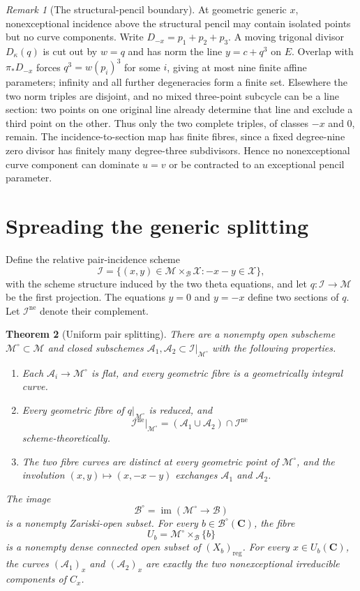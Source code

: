 \documentclass[10pt]{amsart}
\numberwithin{equation}{section}
\newtheorem{theorem}{Theorem}[section]
\theoremstyle{definition}
\theoremstyle{remark}
\newtheorem{remark}[theorem]{Remark}
\newcommand{\CC}{\mathbf C}
\newcommand{\reg}{\mathrm{reg}}
\newcommand{\cI}{\mathcal I}
\newcommand{\cM}{\mathcal M}
\newcommand{\cB}{\mathcal B}
\newcommand{\cX}{\mathcal X}
\newcommand{\cA}{\mathcal A}
\begin{document}
\begin{remark}[The structural-pencil boundary]\label{rem:structural-pencil-correction}
At geometric generic $x$, nonexceptional incidence above the
structural pencil may contain isolated points but no curve
components. Write $D_{-x}=p_1+p_2+p_3$. A moving trigonal divisor
$D_\kappa(q)$ is cut out by $w=q$ and has norm the line
$y=c+q^3$ on $E$. Overlap with $\pi_*D_{-x}$ forces
$q^3=w(p_i)^3$ for some $i$, giving at most nine finite
affine parameters; infinity and all further degeneracies
form a finite set. Elsewhere the two norm triples are
disjoint, and no mixed three-point subcycle can be a
line section: two points on one original line already
determine that line and exclude a third point on the other.
Thus only the two complete triples, of classes $-x$ and
$0$, remain. The incidence-to-section map has finite fibres,
since a fixed degree-nine zero divisor has finitely many
degree-three subdivisors. Hence no nonexceptional curve
component can dominate $u=v$ or be contracted to an
exceptional pencil parameter.
\end{remark}

\section{Spreading the generic splitting}\label{sec:spreading}

Define the relative pair-incidence scheme
\[
 \cI=\{(x,y)\in\cM\times_{\cB}\cX:-x-y\in\cX\},
\]
with the scheme structure induced by the two theta equations, and let
$q:\cI\to\cM$ be the first projection.  The equations $y=0$ and $y=-x$
define two sections of $q$.  Let $\cI^{\mathrm{ne}}$ denote their
complement.

\begin{theorem}[Uniform pair splitting]
\label{thm:uniform-pair-splitting}
There are a nonempty open subscheme $\cM^\circ\subset\cM$ and closed
subschemes $\cA_1,\cA_2\subset\cI|_{\cM^\circ}$ with the following
properties.
\begin{enumerate}[label=\textup{(\roman*)}]
\item Each $\cA_i\to\cM^\circ$ is flat, and every geometric fibre is a
      geometrically integral curve.
\item Every geometric fibre of $q|_{\cM^\circ}$ is reduced, and
\[
 \cI^{\mathrm{ne}}|_{\cM^\circ}
 = (\cA_1\cup\cA_2)\cap\cI^{\mathrm{ne}}
\]
      scheme-theoretically.
\item The two fibre curves are distinct at every geometric point of
      $\cM^\circ$, and the involution
      $(x,y)\mapsto(x,-x-y)$ exchanges $\cA_1$ and $\cA_2$.
\end{enumerate}
The image
\[
 \cB^\circ=\operatorname{im}(\cM^\circ\to\cB)
\]
is a nonempty Zariski-open subset.  For every $b\in\cB^\circ(\CC)$, the
fibre
\[
 U_b=\cM^\circ\times_{\cB}\{b\}
\]
is a nonempty dense connected open subset of $(X_b)_{\reg}$.  For every
$x\in U_b(\CC)$, the curves $(\cA_1)_x$ and $(\cA_2)_x$ are exactly the two
nonexceptional irreducible components of $C_x$.
\end{theorem}
\end{document}
